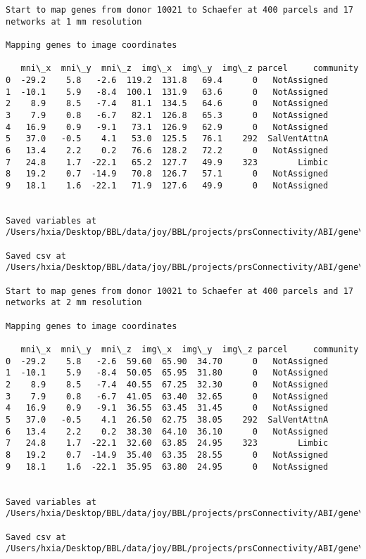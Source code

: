 \documentclass[11pt]{article}
\begin{document}
\begin{Verbatim}[commandchars=\\\{\}]
Start to map genes from donor 10021 to Schaefer at 400 parcels and 17 networks at 1 mm resolution

Mapping genes to image coordinates

   mni\_x  mni\_y  mni\_z  img\_x  img\_y  img\_z parcel     community
0  -29.2    5.8   -2.6  119.2  131.8   69.4      0   NotAssigned
1  -10.1    5.9   -8.4  100.1  131.9   63.6      0   NotAssigned
2    8.9    8.5   -7.4   81.1  134.5   64.6      0   NotAssigned
3    7.9    0.8   -6.7   82.1  126.8   65.3      0   NotAssigned
4   16.9    0.9   -9.1   73.1  126.9   62.9      0   NotAssigned
5   37.0   -0.5    4.1   53.0  125.5   76.1    292  SalVentAttnA
6   13.4    2.2    0.2   76.6  128.2   72.2      0   NotAssigned
7   24.8    1.7  -22.1   65.2  127.7   49.9    323        Limbic
8   19.2    0.7  -14.9   70.8  126.7   57.1      0   NotAssigned
9   18.1    1.6  -22.1   71.9  127.6   49.9      0   NotAssigned


Saved variables at /Users/hxia/Desktop/BBL/data/joy/BBL/projects/prsConnectivity/ABI/gene\_mapping/10021donor\_400Parcels\_17Network\_1mm.pkl

Saved csv at /Users/hxia/Desktop/BBL/data/joy/BBL/projects/prsConnectivity/ABI/gene\_mapping/10021donor\_400Parcels\_17Network\_1mm.csv

Start to map genes from donor 10021 to Schaefer at 400 parcels and 17 networks at 2 mm resolution

Mapping genes to image coordinates

   mni\_x  mni\_y  mni\_z  img\_x  img\_y  img\_z parcel     community
0  -29.2    5.8   -2.6  59.60  65.90  34.70      0   NotAssigned
1  -10.1    5.9   -8.4  50.05  65.95  31.80      0   NotAssigned
2    8.9    8.5   -7.4  40.55  67.25  32.30      0   NotAssigned
3    7.9    0.8   -6.7  41.05  63.40  32.65      0   NotAssigned
4   16.9    0.9   -9.1  36.55  63.45  31.45      0   NotAssigned
5   37.0   -0.5    4.1  26.50  62.75  38.05    292  SalVentAttnA
6   13.4    2.2    0.2  38.30  64.10  36.10      0   NotAssigned
7   24.8    1.7  -22.1  32.60  63.85  24.95    323        Limbic
8   19.2    0.7  -14.9  35.40  63.35  28.55      0   NotAssigned
9   18.1    1.6  -22.1  35.95  63.80  24.95      0   NotAssigned


Saved variables at /Users/hxia/Desktop/BBL/data/joy/BBL/projects/prsConnectivity/ABI/gene\_mapping/10021donor\_400Parcels\_17Network\_2mm.pkl

Saved csv at /Users/hxia/Desktop/BBL/data/joy/BBL/projects/prsConnectivity/ABI/gene\_mapping/10021donor\_400Parcels\_17Network\_2mm.csv


\end{Verbatim}
\end{document}

